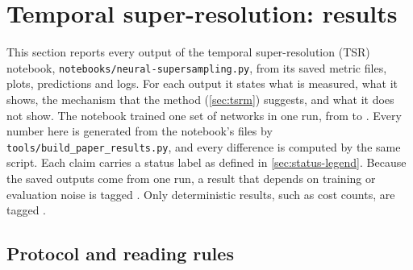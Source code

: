 \section{Temporal super-resolution: results}\label{sec:tsrr}

This section reports every output of the temporal super-resolution (TSR) notebook, \texttt{notebooks/neural-supersampling.py}, from its saved metric files, plots, predictions and logs. For each output it states what is measured, what it shows, the mechanism that the method (\cref{sec:tsrm}) suggests, and what it does not show. The notebook trained one set of networks in one run, from  to . Every number here is generated from the notebook's files by \texttt{tools/build\_paper\_results.py}, and every difference is computed by the same script. Each claim carries a status label as defined in \cref{sec:status-legend}. Because the saved outputs come from one run, a result that depends on training or evaluation noise is tagged \Preliminary. Only deterministic results, such as cost counts, are tagged \Confirmed.

\subsection{Protocol and reading rules}\label{sec:tsrr-protocol}

